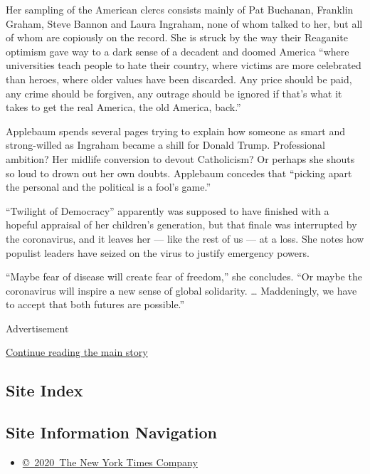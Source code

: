 Her sampling of the American clercs consists mainly of Pat Buchanan,
Franklin Graham, Steve Bannon and Laura Ingraham, none of whom talked to
her, but all of whom are copiously on the record. She is struck by the
way their Reaganite optimism gave way to a dark sense of a decadent and
doomed America ``where universities teach people to hate their country,
where victims are more celebrated than heroes, where older values have
been discarded. Any price should be paid, any crime should be forgiven,
any outrage should be ignored if that's what it takes to get the real
America, the old America, back.''

Applebaum spends several pages trying to explain how someone as smart
and strong-willed as Ingraham became a shill for Donald Trump.
Professional ambition? Her midlife conversion to devout Catholicism? Or
perhaps she shouts so loud to drown out her own doubts. Applebaum
concedes that ``picking apart the personal and the political is a fool's
game.''

``Twilight of Democracy'' apparently was supposed to have finished with
a hopeful appraisal of her children's generation, but that finale was
interrupted by the coronavirus, and it leaves her --- like the rest of
us --- at a loss. She notes how populist leaders have seized on the
virus to justify emergency powers.

``Maybe fear of disease will create fear of freedom,'' she concludes.
``Or maybe the coronavirus will inspire a new sense of global
solidarity. \ldots{} Maddeningly, we have to accept that both futures
are possible.''

Advertisement

\protect\hyperlink{after-bottom}{Continue reading the main story}

\hypertarget{site-index}{%
\subsection{Site Index}\label{site-index}}

\hypertarget{site-information-navigation}{%
\subsection{Site Information
Navigation}\label{site-information-navigation}}

\begin{itemize}
\tightlist
\item
  \href{https://help.nytimes.com/hc/en-us/articles/115014792127-Copyright-notice}{©~2020~The
  New York Times Company}
\end{itemize}

